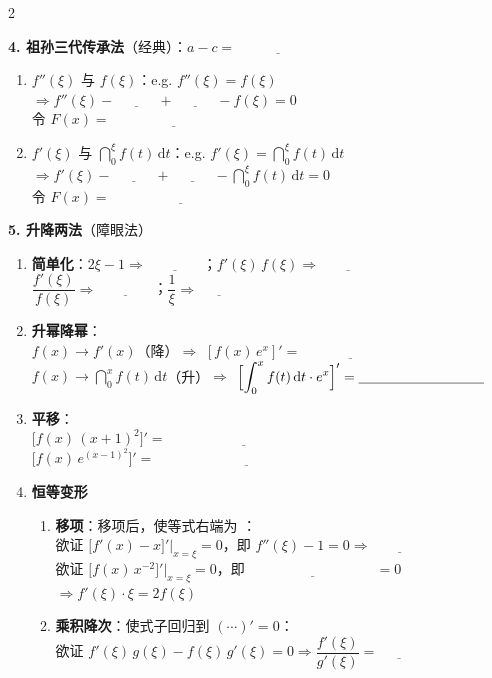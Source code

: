 \documentclass[a4paper,12pt]{article}
\newcommand{\blank}[1][3em]{\underline{\hspace{#1}}}
\begin{document}
\begin{multicols}{2}
\vspace{0.5em}

\textbf{4. 祖孙三代传承法}（经典）：$a - c = \blank[6em]$
\begin{enumerate}[label=\alph*., leftmargin=1.8em, itemsep=1.7em]
    \item $f''(\xi)$ 与 $f(\xi)$：e.g. $f''(\xi) = f(\xi)$
          \\$\Rightarrow f''(\xi) - \blank[3em] + \blank[3em] - f(\xi) = 0$
          \\令 $F(x) = \blank[9em]$
    \item $f'(\xi)$ 与 $\dint_{0}^{\xi} f(t)\,\mathrm{d}t$：e.g. $f'(\xi) = \dint_{0}^{\xi} f(t)\,\mathrm{d}t$
          \\$\Rightarrow f'(\xi) - \blank[3em] + \blank[3em] - \dint_{0}^{\xi} f(t)\,\mathrm{d}t = 0$
          \\令 $F(x) = \blank[10em]$
\end{enumerate}

\vspace{0.5em}

\textbf{5. 升降两法}（障眼法）
\begin{enumerate}[label=\alph*., leftmargin=1.8em, itemsep=1.7em]
    \item \textbf{简单化}：$2\xi - 1 \Rightarrow \blank[4em]$；\quad $f'(\xi)\,f(\xi) \Rightarrow \blank[4em]$
          \\$\dfrac{f'(\xi)}{f(\xi)} \Rightarrow \blank[4em]$；\quad $\dfrac{1}{\xi} \Rightarrow \blank[3em]$
    \item \textbf{升幂降幂}：
          \\$f(x) \to f'(x)$（降）$\Rightarrow$ $[f(x)\,e^{x}]' = \blank[7em]$
          \\$f(x) \to \dint_{0}^{x} f(t)\,\mathrm{d}t$（升）$\Rightarrow$ $\Bigl[\dint_{0}^{x} f(t)\,\mathrm{d}t \cdot e^{x}\Bigr]' = \blank[9em]$
    \item \textbf{平移}：
          \\$\bigl[f(x)\,(x + 1)^{2}\bigr]' = \blank[11em]$
          \\$\bigl[f(x)\,e^{(x - 1)^{2}}\bigr]' = \blank[13em]$
    \item \textbf{恒等变形}
          \begin{enumerate}[label=（\chinese*）, leftmargin=2.8em, itemsep=1.7em]
              \item \textbf{移项}：移项后，使等式右端为 \blank[2em]：
                    \\欲证 $\bigl[f'(x) - x\bigr]'\bigr|_{x = \xi} = 0$，即 $f''(\xi) - 1 = 0 \Rightarrow \blank[4em]$
                    \\欲证 $\bigl[f(x)\,x^{-2}\bigr]'\bigr|_{x = \xi} = 0$，即 $\blank[9em] = 0$
                    \\$\Rightarrow f'(\xi)\cdot\xi = 2f(\xi)$
              \item \textbf{乘积降次}：使式子回归到 $(\cdots)' = 0$：
                    \\欲证 $f'(\xi)\,g(\xi) - f(\xi)\,g'(\xi) = 0 \Rightarrow \dfrac{f'(\xi)}{g'(\xi)} = \blank[3em]$
          \end{enumerate}
\end{enumerate}


\end{multicols}
\end{document}
